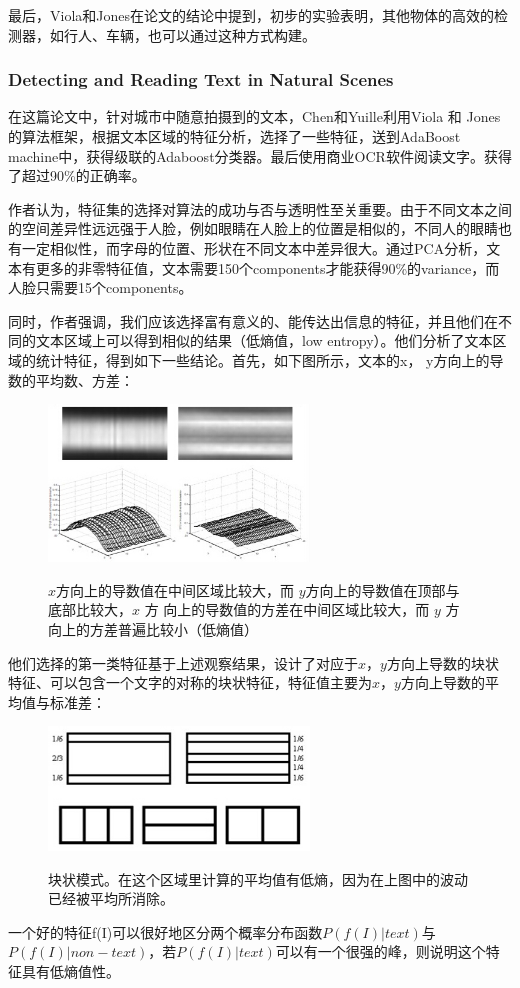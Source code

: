 最后，Viola和Jones在论文的结论中提到，初步的实验表明，其他物体的高效的检测器，如行人、车辆，也可以通过这种方式构建。
\subsubsection{Detecting and Reading Text in Natural Scenes}
在这篇论文中\cite{dr_natural_scenes}，针对城市中随意拍摄到的文本，Chen和Yuille利用Viola 和 Jones的算法框架，根据文本区域的特征分析，选择了一些特征，送到AdaBoost machine中，获得级联的Adaboost分类器。最后使用商业OCR软件阅读文字。获得了超过90\%的正确率。

作者认为，特征集的选择对算法的成功与否与透明性至关重要。由于不同文本之间的空间差异性远远强于人脸，例如眼睛在人脸上的位置是相似的，不同人的眼睛也有一定相似性，而字母的位置、形状在不同文本中差异很大。通过PCA分析，文本有更多的非零特征值，文本需要150个components才能获得90\%的variance，而人脸只需要15个components。

同时，作者强调，我们应该选择富有意义的、能传达出信息的特征，并且他们在不同的文本区域上可以得到相似的结果（低熵值，low entropy）。他们分析了文本区域的统计特征，得到如下一些结论。首先，如下图所示，文本的x， y方向上的导数的平均数、方差：
\begin{figure}[H]
    \centering 
    \includegraphics[width=0.618\textwidth]{image/2_1_1_6.jpg}    
    \label{logic}
    \caption{$x$方向上的导数值在中间区域比较大，而 $y$方向上的导数值在顶部与底部比较大，$x$ 方
向上的导数值的方差在中间区域比较大，而 $y$ 方向上的方差普遍比较小（低熵值）}
\end{figure}

他们选择的第一类特征基于上述观察结果，设计了对应于$x， y$方向上导数的块状特征、可以包含一个文字的对称的块状特征，特征值主要为$x， y$方向上导数的平均值与标准差：
\begin{figure}[H]
    \centering 
    \includegraphics[width=0.618\textwidth]{image/2_1_1_7.jpg}    
    \label{logic}
    \caption{块状模式。在这个区域里计算的平均值有低熵，因为在上图中的波动已经被平均所消除。}
\end{figure}
一个好的特征f(I)可以很好地区分两个概率分布函数$P(f(I)|text)$与$P(f(I)|non-text)$，若$P(f(I)|text)$可以有一个很强的峰，则说明这个特征具有低熵值性。

